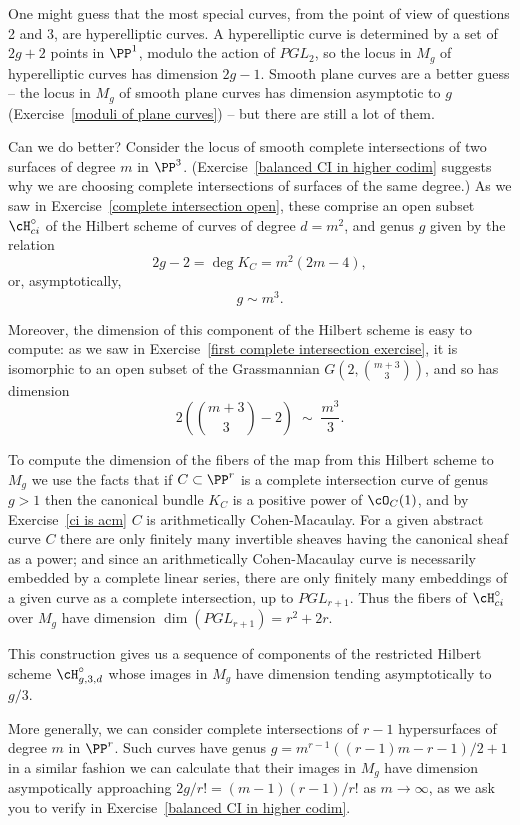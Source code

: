 One might guess that the most special curves, from the point of view of questions 2 and 3, are hyperelliptic curves. A hyperelliptic curve is determined by a set of $2g+2$ points in $\PP^{1}$, modulo the action of $PGL_{2}$, so the locus in $M_g$ of hyperelliptic curves has dimension $2g-1$. Smooth plane curves are a better guess  --  the locus in $M_g$ of smooth plane curves has dimension asymptotic to $g$ (Exercise~\ref{moduli of plane curves}) -- but there are still a lot of them.

Can we do better?  Consider the locus of smooth complete intersections
of two surfaces of degree $m$ in $\PP^3$. 
(Exercise~\ref{balanced CI in higher codim}  
suggests why we are choosing complete
intersections of surfaces of the same degree.) As we saw in
Exercise~\ref{complete intersection open}, these comprise an open
subset $\cH^\circ_{ci}$ of the Hilbert scheme of curves of degree $d =
m^2$, and genus $g$ given by the relation
$$
2g-2 = \deg K_C = m^2(2m-4),
$$
or, asymptotically,
$$
g \sim m^3.
$$

Moreover, the dimension of this component of the Hilbert scheme is easy to compute: as we saw in Exercise~\ref{first complete intersection exercise},  it is isomorphic to an open subset of the Grassmannian $G(2, \binom{m+3}{3})$, and so has dimension
$$
2\left(\binom{m+3}{3} - 2\right) \; \sim \; \frac{m^3}{3}.
$$

To compute the dimension of the fibers of the map from this Hilbert scheme to $M_{g}$ we use 
the facts that if $C \subset \PP^r$ is a complete intersection curve of genus $g >1$ then the canonical bundle $K_C$ is a positive power of $\cO_C(1)$, and by Exercise~\ref{ci is acm}  $C$ is arithmetically Cohen-Macaulay.
For a given abstract curve $C$ there are only finitely many invertible sheaves having the canonical sheaf as a power; and since an arithmetically Cohen-Macaulay curve is necessarily embedded by a complete linear series, there are only finitely many embeddings of a given curve as a complete intersection, up to $PGL_{r+1}$. Thus the fibers of $\cH^\circ_{ci}$ over $M_g$ have dimension $\dim(PGL_{r+1}) = r^2 + 2r$.

This construction gives us a sequence of components of the restricted Hilbert scheme $\cH^\circ_{g,3,d}$ whose images in $M_g$ have dimension tending asymptotically to $g/3$.

More generally, we can consider complete intersections of $r-1$ hypersurfaces of degree $m$ in $\PP^r$. Such curves have
genus $g = m^{r-1}((r-1)m-r-1)/2 +1$ in a similar fashion we can calculate that their images in $M_g$ have dimension asympotically approaching $2g/r!= (m-1)(r-1)/r!$
 as $m \to \infty$, as we ask you to verify in Exercise~\ref{balanced CI in higher codim}.


